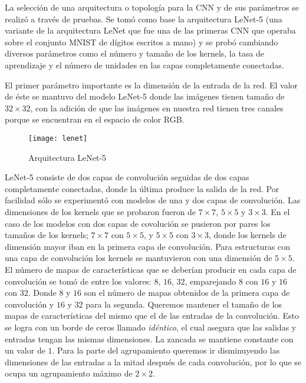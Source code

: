 La selección de una arquitectura o topología para la CNN y de sus parámetros se
realizó a través de pruebas. Se tomó como base 
la arquitectura LeNet-5\cite{Lecun98gradient-basedlearning} (una variante de la arquitectura LeNet  que fue una de las primeras CNN que operaba sobre el 
conjunto MNIST de dígitos escritos a mano) y se probó cambiando
diversos parámetros como el número y tamaño de los kernels, la tasa de aprendizaje y el número de unidades en las capas completamente conectadas.

El primer parámetro importante es la dimensión de
la entrada de la red. El valor de éste se mantuvo del
modelo LeNet-5 donde las imágenes tienen tamaño de $32 \times 32$,
con la adición de que las imágenes en nuestra red
tienen tres canales porque se encuentran en el espacio de 
color RGB.

\begin{figure}[!ht]
\centering
\caption{Arquitectura LeNet-5}
\texttt{[image: lenet]}
\end{figure}

LeNet-5 consiste de dos capas de convolución seguidas de dos
capas completamente conectadas, donde la última produce
la salida de la red.
Por facilidad sólo se experimentó con modelos de una y dos capas
de convolución. Las dimensiones de los kernels  que se probaron fueron de 
$7 \times 7$,
$5 \times 5$ y $3 \times 3$. En el caso de los modelos con
dos capas de covolución se pusieron por pares los tamaños de
los kernels; $7 \times 7$ con
$5 \times 5$, y $5 \times 5$ con $3 \times 3$, donde los kernels
de dimensión mayor iban en la primera capa de convolución.
Para estructuras con una capa de convolución los kernels
se mantuvieron con una dimensión de $5 \times 5$.
El número de mapas de características que se deberían producir
en cada capa de convolución se tomó de entre los valores: $8$, 
$16$, $32$, emparejando $8$ con $16$ y $16$ con $32$.
Donde $8$ y $16$ son el número de mapas obtenidos de la primera 
capa de convolución y $16$ y $32$ para la segunda.
Queremos mantener el tamaño de los mapas de
características del mismo que el de las entradas de la convolución.
Esto se logra con un borde de ceros llamado \textit{idéntico}, 
el cual asegura que las salidas y entradas tengan las mismas dimensiones. 
La zancada se mantiene constante con un valor de $1$.
Para la parte del agrupamiento queremos ir disminuyendo las 
dimensiones de las entradas a la mitad después de cada
convolución, por lo que se ocupa un agrupamiento máximo 
de $2 \times 2$.



